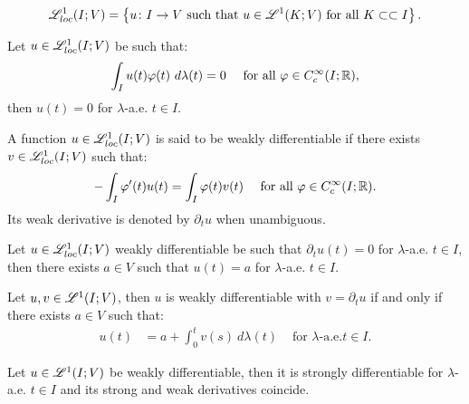 \begin{definition}
    \begin{align}
        \mathscr{L}^{1}_{loc}(I; V) = \left\{ u\colon I \rightarrow V  \text{ such that } u \in \mathscr{L}^{1}(K; V) \text{ for all } K \subset \subset I \right\}.
    \end{align}
\end{definition}

\begin{corollary}
    Let $u \in \mathscr{L}^{1}_{loc}(I; V)$ be such that:
    \begin{align}
        \int_I u(t) \varphi(t) ~ d \lambda(t) &= 0 &\text{ for all } \varphi \in C_c^{\infty}(I; \mathbb{R}),
    \end{align}
    then $u(t) = 0$ for $\lambda$-a.e. $t \in I$.
\end{corollary}

\begin{definition}
    A function $u \in \mathscr{L}^{1}_{loc}(I; V)$ is said to be weakly differentiable if there exists $v \in \mathscr{L}^{1}_{loc}(I; V)$ such that:
    \begin{align}
        - \int_I \varphi^{\prime}(t) u(t) &= \int_I \varphi(t) v(t) &\text{ for all } \varphi \in C_c^{\infty}(I; \mathbb{R}).
    \end{align}
    Its weak derivative is denoted by $\partial_t u$ when unambiguous.
\end{definition}

\begin{lemma}
    Let $u \in \mathscr{L}^{1}_{loc}(I; V)$ weakly differentiable be such that $\partial_t u(t) = 0$ for $\lambda$-a.e. $t \in I$, then there exists $a \in V$ such that $u(t) = a$ for $\lambda$-a.e. $t \in I$.
\end{lemma}

\begin{theorem}
    Let $u, v \in \mathscr{L}^{1}(I; V)$, then $u$ is weakly differentiable with $v = \partial_t u$ if and only if there exists $a \in V$ such that:
    \begin{align}
        u(t) &= a + \int_0^t v(s) ~ d \lambda(t) &\text{ for } \lambda \text{-a.e.} t \in I.
    \end{align}
\end{theorem}

\begin{corollary}
    Let $u \in \mathscr{L}^{1}(I; V)$ be weakly differentiable, then it is strongly differentiable for $\lambda$-a.e. $t \in I$ and its strong and weak derivatives coincide.
\end{corollary}

